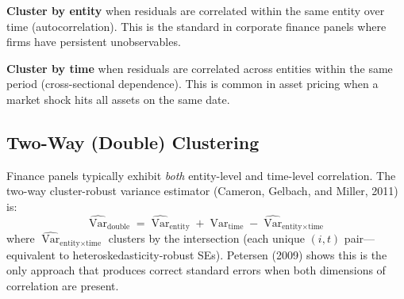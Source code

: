 \textbf{Cluster by entity} when residuals are correlated within the same entity over time (autocorrelation).
This is the standard in corporate finance panels where firms have persistent unobservables.

\textbf{Cluster by time} when residuals are correlated across entities within the same period (cross-sectional dependence).
This is common in asset pricing when a market shock hits all assets on the same date.

\subsection{Two-Way (Double) Clustering}

Finance panels typically exhibit \emph{both} entity-level and time-level correlation.
The two-way cluster-robust variance estimator (Cameron, Gelbach, and Miller, 2011) is:
\begin{equation}
  \widehat{\operatorname{Var}}_{\text{double}} = \widehat{\operatorname{Var}}_{\text{entity}} + \widehat{\operatorname{Var}}_{\text{time}} - \widehat{\operatorname{Var}}_{\text{entity} \times \text{time}}
  \label{eq:double-cluster}
\end{equation}
where $\widehat{\operatorname{Var}}_{\text{entity} \times \text{time}}$ clusters by the intersection (each unique $(i,t)$ pair---equivalent to heteroskedasticity-robust SEs).
Petersen (2009) shows this is the only approach that produces correct standard errors when both dimensions of correlation are present.

